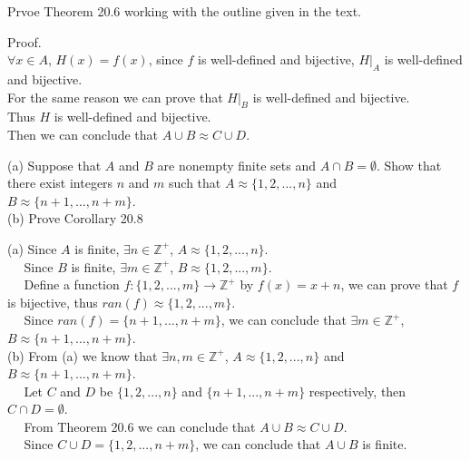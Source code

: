 \documentclass[11pt, a4paper, UTF8]{ctexart}
\begin{document}
\begin{problem}[UD: 20.8]
  Prvoe Theorem 20.6 working with the outline given in the text.
\end{problem}

\begin{solution}
  Proof.\\
  $\forall x \in A$, $H(x) = f(x)$, since $f$ is well-defined and 
  bijective, $H|_{A}$ is well-defined and bijective.\\
  For the same reason we can prove that $H|_{B}$ is well-defined 
  and bijective.\\
  Thus $H$ is well-defined and bijective.\\
  Then we can conclude that $A \cup B \approx C \cup D$.
\end{solution}
\begin{problem}[UD: 20.9]
  (a) Suppose that $A$ and $B$ are nonempty finite sets and $A \cap B = \emptyset$. 
  Show that there exist integers $n$ and $m$ such that $A \approx \{ 1,2,...,n \}$ 
  and $B \approx \{ n + 1,...,n + m \}$.\\
  (b) Prove Corollary 20.8
\end{problem}


\begin{solution}
  (a) Since $A$ is finite, $\exists n \in \mathbb{Z}^{+}$, $A \approx \{ 1,2,...,n \}$.\\
  $~~~~~~$Since $B$ is finite, $\exists m \in \mathbb{Z}^{+}$, $B \approx \{ 1,2,...,m \}$.\\
  $~~~~~~$Define a function $f: \{ 1,2,...,m \} \rightarrow \mathbb{Z}^{+}$ by 
  $f(x) = x + n$, we can prove that $f$ is bijective, thus $ran(f) \approx \{ 1,2,...,m \}$.\\
  $~~~~~~$Since $ran(f) = \{ n + 1,...,n + m \}$, we can conclude that 
  $\exists m \in \mathbb{Z}^{+}$, $B \approx \{ n + 1,...,n + m \}$.\\
  (b) From (a) we know that $\exists n, m \in \mathbb{Z}^{+}$, $A \approx \{ 1,2,...,n \}$ 
  and $B \approx \{ n + 1,...,n + m \}$.\\
  $~~~~~~$Let $C$ and $D$ be $\{ 1,2,...,n \}$ and $\{ n + 1,...,n + m \}$ 
  respectively, then $C \cap D = \emptyset$.\\
  $~~~~~~$From Theorem 20.6 we can conclude that $A \cup B \approx C \cup D$.\\
  $~~~~~~$Since $C \cup D = \{ 1,2,...,n + m \}$, we can conclude that 
  $A \cup B$ is finite.
\end{solution}
\end{document}
